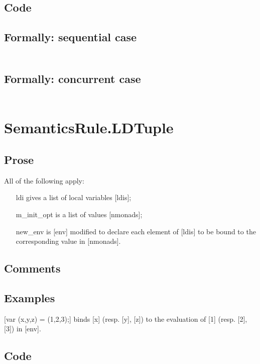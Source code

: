 \documentclass{book}
\begin{document}
  \subsection{Code}

  \subsection{Formally: sequential case}
  \begin{align}
  \end{align} 

  \subsection{Formally: concurrent case}
  \begin{align}
  \end{align} 

\section{SemanticsRule.LDTuple \label{sec:SemanticsRule.LDTuple}}

    \subsection{Prose}
    All of the following apply:
    \begin{itemize}
    \item [ldi] gives a list of local variables [ldis];
    \item [m\_init\_opt] is a list of values [nmonads];
    \item [new\_env] is [env] modified to declare each element of [ldis] to be bound
      to the corresponding value in [nmonads].
    \end{itemize}

    \subsection{Comments}

    \subsection{Examples}
    [var (x,y,z) = (1,2,3);] binds [x] (resp. [y], [z]) to the evaluation of
    [1] (resp. [2], [3]) in [env].

  \subsection{Code}
\end{document}
